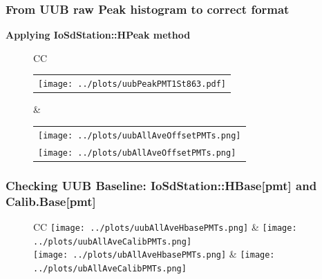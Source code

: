 \documentclass[aspectratio=169]{beamer}
\begin{document}
\begin{frame}
	\frametitle{From UUB raw Peak histogram to correct format}
	{\bf Applying IoSdStation::HPeak method}
	\begin{figure}
		\centering
		\begin{tabularx}{\textwidth}{CC}
			\\ 
      \begin{tabular}{l}
				\texttt{[image: ../plots/uubPeakPMT1St863.pdf]}
			\end{tabular}
      &
      \begin{tabular}{l}
        \texttt{[image: ../plots/uubAllAveOffsetPMTs.png]}
        \\
        \texttt{[image: ../plots/ubAllAveOffsetPMTs.png]}
      \end{tabular}
		\end{tabularx}
	\end{figure}
\end{frame}





\begin{frame}
	\frametitle{Checking UUB Baseline: IoSdStation::HBase[pmt] and Calib.Base[pmt]}
	\begin{figure}
		\centering
		\begin{tabularx}{\textwidth}{CC}
			\texttt{[image: ../plots/uubAllAveHbasePMTs.png]}
			&
      \texttt{[image: ../plots/uubAllAveCalibPMTs.png]}
			\\
			\texttt{[image: ../plots/ubAllAveHbasePMTs.png]}
			&
			\texttt{[image: ../plots/ubAllAveCalibPMTs.png]}
		\end{tabularx}
	\end{figure}
\end{frame}
\end{document}
